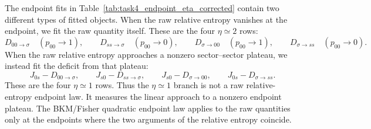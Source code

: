 \documentclass{article}
\theoremstyle{plain}
\theoremstyle{definition}
\theoremstyle{plain}
\begin{document}
The endpoint fits in Table~\ref{tab:task4_endpoint_eta_corrected} contain two different
types of fitted objects.  When the raw relative entropy vanishes at the endpoint, we fit the
raw quantity itself.  These are the four \(\eta\simeq2\) rows:
\[
    D_{00\rightarrow\sigma}\quad(p_{00}\rightarrow1),\qquad
    D_{ss\rightarrow\sigma}\quad(p_{00}\rightarrow0),\qquad
    D_{\sigma\rightarrow00}\quad(p_{00}\rightarrow1),\qquad
    D_{\sigma\rightarrow ss}\quad(p_{00}\rightarrow0).
\]
When the raw relative entropy approaches a nonzero sector--sector plateau, we instead fit the
deficit from that plateau:
\[
    J_{0s}-D_{00\rightarrow\sigma},\qquad
    J_{s0}-D_{ss\rightarrow\sigma},\qquad
    J_{s0}-D_{\sigma\rightarrow00},\qquad
    J_{0s}-D_{\sigma\rightarrow ss}.
\]
These are the four \(\eta\simeq1\) rows.  Thus the \(\eta\simeq1\) branch is not a raw
relative-entropy endpoint law.  It measures the linear approach to a nonzero endpoint plateau.
The BKM/Fisher quadratic endpoint law applies to the raw quantities only at the endpoints where
the two arguments of the relative entropy coincide.
\end{document}
